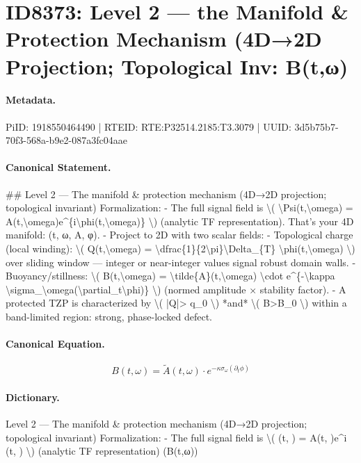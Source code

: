 \section*{ID8373: Level 2 — the Manifold \& Protection Mechanism (4D→2D Projection; Topological Inv: B(t,ω)}
\paragraph{Metadata.}
PiID: 1918550464490 | RTEID: RTE:P32514.2185:T3.3079 | UUID: 3d5b75b7-70f3-568a-b9e2-087a3fc04aae

\paragraph{Canonical Statement.}
\#\# Level 2 — The manifold \& protection mechanism (4D→2D projection; topological invariant) Formalization: - The full signal field is \textbackslash{}( \textbackslash{}Psi(t,\textbackslash{}omega) = A(t,\textbackslash{}omega)e\textasciicircum{}\{i\textbackslash{}phi(t,\textbackslash{}omega)\} \textbackslash{}) (analytic TF representation). That’s your 4D manifold: (t, ω, A, φ). - Project to 2D with two scalar fields: - Topological charge (local winding): \textbackslash{}( Q(t,\textbackslash{}omega) = \textbackslash{}dfrac\{1\}\{2\textbackslash{}pi\}\textbackslash{}Delta\_\{T\} \textbackslash{}phi(t,\textbackslash{}omega) \textbackslash{}) over sliding window — integer or near-integer values signal robust domain walls. - Buoyancy/stillness: \textbackslash{}( B(t,\textbackslash{}omega) = \textbackslash{}tilde\{A\}(t,\textbackslash{}omega) \textbackslash{}cdot e\textasciicircum{}\{-\textbackslash{}kappa \textbackslash{}sigma\_\textbackslash{}omega(\textbackslash{}partial\_t\textbackslash{}phi)\} \textbackslash{}) (normed amplitude × stability factor). - A protected TZP is characterized by \textbackslash{}( |Q|> q\_0 \textbackslash{}) *and* \textbackslash{}( B>B\_0 \textbackslash{}) within a band-limited region: strong, phase-locked defect.

\paragraph{Canonical Equation.}
\[
B(t,\omega) = \tilde{A}(t,\omega) \cdot e^{-\kappa \sigma_\omega(\partial_t\phi)}
\]

\paragraph{Dictionary.}
Level 2 — The manifold \& protection mechanism (4D→2D projection; topological invariant) Formalization: - The full signal field is \textbackslash{}( (t, ) = A(t, )e\textasciicircum{}i (t, ) \textbackslash{}) (analytic TF representation) (B(t,ω))

